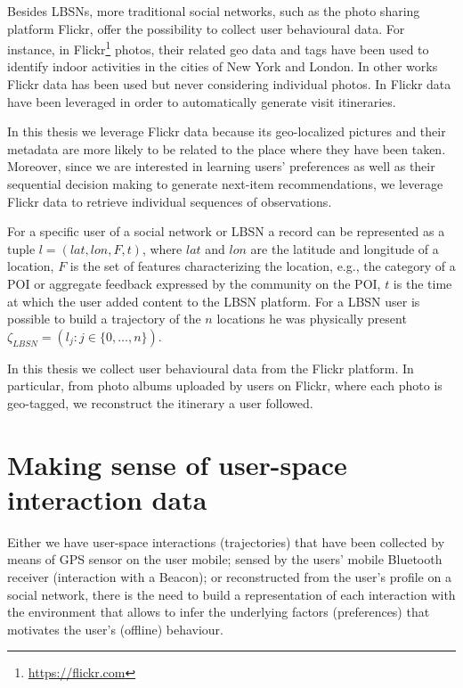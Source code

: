 Besides LBSNs, more traditional social networks, such as the photo sharing platform Flickr, offer the possibility to collect user behavioural data.
For instance, in \cite{indoor:lbsn:2018} Flickr\footnote{\url{https://flickr.com}} photos, their related geo data and tags have been used to identify indoor activities in the cities of New York and London. In other works \cite{danub:lbsn:2019} Flickr data has been used but never considering individual photos.
In \cite{lbsn:itineraries:2010} Flickr data have been leveraged in order to automatically generate visit itineraries. 

In this thesis we leverage Flickr data because its geo-localized pictures and their metadata are more likely to be related to the place where they have been taken. Moreover, since we are interested in learning users' preferences as well as their sequential decision making to generate next-item recommendations, we leverage Flickr data to retrieve individual sequences of observations.

For a specific user of a social network or LBSN a record can be represented as a tuple $l = (lat, lon, F, t)$, where $lat$ and $lon$ are the latitude and longitude of a location, $F$ is the set of features characterizing the location, e.g., the category of a POI or aggregate feedback expressed by the community on the POI, $t$ is the time at which the user added content to the LBSN platform.
For a LBSN user is possible to build a trajectory of the $n$ locations he was physically present %
$\zeta_{LBSN} = (l_j: j \in \{ 0, \dots, n\})$.

In this thesis we collect user behavioural data from the Flickr platform. In particular, from photo albums uploaded by users on Flickr, where each photo is geo-tagged, we reconstruct the itinerary a user followed.

\section{Making sense of user-space interaction data}
\label{sec:user-space_mapping}
Either we have 
user-space interactions (trajectories) that have been collected by means of GPS sensor on the user mobile; sensed by the users' mobile Bluetooth receiver (interaction with a Beacon); or reconstructed from the user's profile on a social network, there is the need to build a representation of each interaction with the environment that allows to infer the underlying factors (preferences) that motivates the user's (offline) behaviour.

